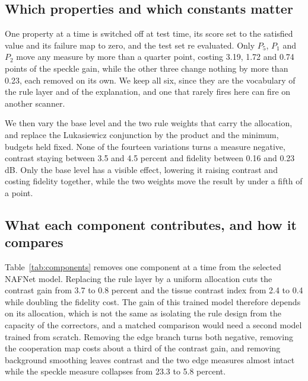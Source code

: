 \subsection{Which properties and which constants matter}
\label{sec:predicate_ablation}
\label{sec:sensitivity}
One property at a time is switched off at test time, its score set to the satisfied value and its
failure map to zero, and the test set re evaluated. Only $P_5$, $P_1$ and $P_2$ move any measure by
more than a quarter point, costing 3.19, 1.72 and 0.74 points of the speckle gain, while the other
three change nothing by more than 0.23, each removed on its own. We keep all six, since they are the
vocabulary of the rule layer and of the explanation, and one that rarely fires here can fire on
another scanner.

We then vary the base level and the two rule weights that carry the allocation, and replace the
Lukasiewicz conjunction by the product and the minimum, budgets held fixed. None of the fourteen
variations turns a measure negative, contrast staying between 3.5 and 4.5 percent and fidelity
between 0.16 and 0.23 dB. Only the base level has a visible effect, lowering it raising contrast and
costing fidelity together, while the two weights move the result by under a fifth of a point.

\begin{table}[!tb]
\centering
\caption{Duke17 and Duke2013, the models of Table~\ref{tab:pku37} applied with no parameter updated,
no threshold recalibrated and no statistic of the target images used to select anything. Columns and
seeds as in Table~\ref{tab:pku37}. The backbones alone read 27.03, 26.89, 27.06 and 27.59 dB on
Duke17 and 27.33, 27.21, 26.89 and 28.12 dB on Duke2013.}
\label{tab:zeroshot}
\setlength{\tabcolsep}{1.1pt}
\scriptsize
\setlength{\aboverulesep}{0pt}
\setlength{\belowrulesep}{0pt}
\renewcommand{\arraystretch}{0.95}

\end{table}

\subsection{What each component contributes, and how it compares}
\label{sec:component_ablation}
\label{sec:matched}
Table~\ref{tab:components} removes one component at a time from the selected NAFNet model. Replacing
the rule layer by a uniform allocation cuts the contrast gain from 3.7 to 0.8 percent and the tissue
contrast index from 2.4 to 0.4 while doubling the fidelity cost. The gain of this trained model
therefore depends on its allocation, which is not the same as isolating the rule design from the
capacity of the correctors, and a matched comparison would need a second model trained from
scratch. Removing the edge
branch turns both negative, removing the cooperation map costs about a third of the contrast gain,
and removing background smoothing leaves contrast and the two edge measures almost intact while the
speckle measure collapses from 23.3 to 5.8 percent.

